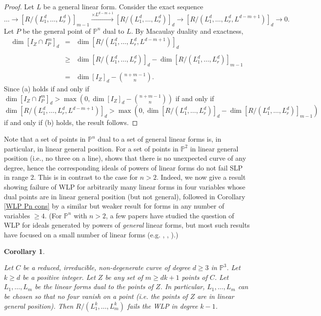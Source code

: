 \documentclass[12pt]{amsart}
\numberwithin{equation}{section}
\newtheorem{corollary}[theorem]{Corollary}
\theoremstyle{definition}
\newcommand{\PP}{ \ensuremath{\mathbb{P}}}
\begin{document}
\begin{proof}
Let $L$ be a general linear form. Consider the exact sequence
\begin{equation} \label{LES}
\dots \rightarrow [R/(L_1^d, \dots, L_{r}^d)]_{m-1} \stackrel{\times L^{d-m+1}}{\longrightarrow} [R/(L_1^{d},\dots,L_{r}^{d})]_{d} \rightarrow
[R/(L_1^{d},\dots,L_{r}^{d},L^{d-m+1})]_{d} \rightarrow 0.
\end{equation}
Let $P$ be the general point of $\PP^n$ dual to $L$. By Macaulay duality \cite{EI} and exactness, 
\[
\begin{array}{rcl}
\dim [I_Z \cap I_P^{m}]_{d} & = &  \dim [R/(L_1^{d} , \dots, L_r^{d},L^{d-m+1})]_{d} \\ \\
& \geq & \dim [R/(L_1^d,\dots, L_r^d)]_d - \dim [R/(L_1^d,\dots,L_r^d)]_{m-1} \\ \\
& = & \displaystyle \dim [I_Z]_d - \binom{n+m-1}{n}.
\end{array}
\]
Since (a) holds if and only if $\dim [I_Z \cap I_P^{m}]_{d}>\max(0, \dim [I_Z]_d - \binom{n+m-1}{n})$
if and only if $\dim [R/(L_1^{d} , \dots, L_r^{d},L^{d-m+1})]_{d}>\max(0, \dim [R/(L_1^d,\dots, L_r^d)]_d - \dim [R/(L_1^d,\dots,L_r^d)]_{m-1})$
if and only if (b) holds, the result follows.
\end{proof}

Note that a set of points in $\PP^n$ dual to a set of general linear forms is, in particular, in linear general position. 
For a set of points in $\PP^2$ in linear general position (i.e., no three on a line), \cite{CHMN} shows that there is no 
unexpected curve of any degree, hence the corresponding ideals of powers of linear forms do not fail SLP in range 2.
This is in contrast to the case for $n>2$.
Indeed, we now give a result showing failure of WLP for arbitrarily many linear forms in four variables whose dual points are in linear general position 
(but not general), followed in Corollary \ref{WLP Pn cons} by a similar but weaker result for forms in any number of variables $\geq 4$.
(For $\PP^n$ with $n>2$, a few papers have studied the question of WLP for ideals generated by powers of {\em general} linear forms, 
but most such results have focused on a small number of linear forms (e.g. \cite{HSS}, \cite{MMN}, \cite{SS}).)


\begin{corollary} \label{WLP for curves in P3}

Let $C$ be a reduced, irreducible, non-degenerate curve of degree $d \geq 3$ in $\PP^3$. Let $k \geq d$ be a positive integer. 
Let $Z$ be any set of $m \geq dk+1$ points of $C$. Let $L_1,\dots,L_m$ be the linear forms dual to the points of $Z$. In particular, $L_1,\dots,L_m$ 
can be chosen so that no four vanish on a point (i.e. the points of $Z$ are in linear general position). Then $R/(L_1^k,\dots,L_m^k)$ fails the WLP in degree $k-1$.

\end{corollary}
\end{document}
